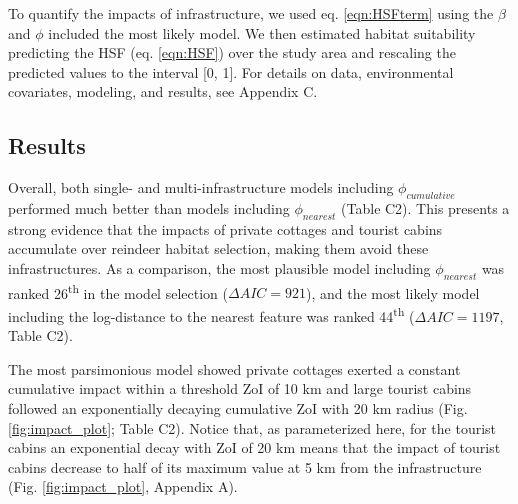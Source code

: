 \documentclass[titlepage]{article}
\begin{document}
To quantify the impacts of infrastructure, we used eq. \ref{eqn:HSFterm} using the $\beta$ and $\phi$ included the most likely model. We then estimated habitat suitability predicting the HSF (eq. \ref{eqn:HSF}) over the study area and rescaling the predicted values to the interval [0, 1]. For details on data, environmental covariates, modeling, and results, see Appendix C.

\subsection{Results}

Overall, both single- and multi-infrastructure models including $\phi_{cumulative}$ performed much better than models including $\phi_{nearest}$ (Table C2). This presents a strong evidence that the impacts of private cottages and tourist cabins accumulate over reindeer habitat selection, making them avoid these infrastructures. As a comparison, the most plausible model including $\phi_{nearest}$ was ranked 26\textsuperscript{th} in the model selection ($\Delta AIC = 921$), and the most likely model including the log-distance to the nearest feature was ranked 44\textsuperscript{th} ($\Delta AIC = 1197$, Table C2).

The most parsimonious model showed private cottages exerted a constant cumulative impact within a threshold ZoI of 10 km and large tourist cabins followed an exponentially decaying cumulative ZoI with 20 km radius (Fig. \ref{fig:impact_plot}; Table C2). Notice that, as parameterized here, for the tourist cabins an exponential decay with ZoI of 20 km means
that the impact of tourist cabins decrease to half of its maximum value
at 5 km from the infrastructure (Fig. \ref{fig:impact_plot}, Appendix A). 
\end{document}
